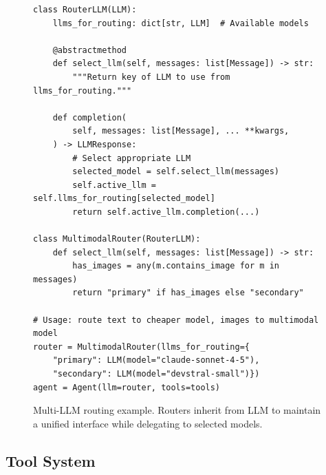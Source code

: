 \begin{figure}[t]
\begin{verbatim}
class RouterLLM(LLM):
    llms_for_routing: dict[str, LLM]  # Available models
    
    @abstractmethod
    def select_llm(self, messages: list[Message]) -> str:
        """Return key of LLM to use from llms_for_routing."""

    def completion(
        self, messages: list[Message], ... **kwargs,
    ) -> LLMResponse:
        # Select appropriate LLM
        selected_model = self.select_llm(messages)
        self.active_llm = self.llms_for_routing[selected_model]
        return self.active_llm.completion(...)

class MultimodalRouter(RouterLLM):
    def select_llm(self, messages: list[Message]) -> str:
        has_images = any(m.contains_image for m in messages)
        return "primary" if has_images else "secondary"

# Usage: route text to cheaper model, images to multimodal model
router = MultimodalRouter(llms_for_routing={
    "primary": LLM(model="claude-sonnet-4-5"),
    "secondary": LLM(model="devstral-small")})
agent = Agent(llm=router, tools=tools)
\end{verbatim}
\caption{Multi-LLM routing example. Routers inherit from LLM to maintain a unified interface while delegating to selected models.}
\label{fig:llm-router}
\end{figure}


\subsection{Tool System}
\label{sec:tool}

